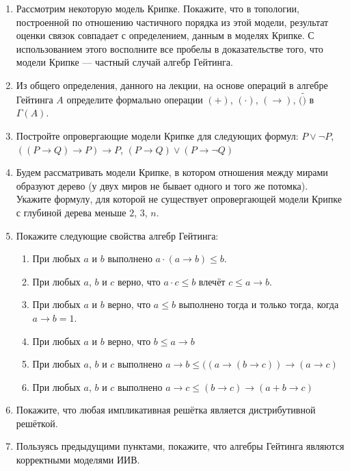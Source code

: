 \documentclass[10pt,a4paper,oneside]{article}
\begin{document}
\begin{enumerate}
\item Рассмотрим некоторую модель Крипке. Покажите, что в топологии, построенной по 
отношению частичного порядка из этой модели, результат оценки связок совпадает с определением, 
данным в моделях Крипке. С использованием этого восполните все пробелы в доказательстве 
того, что модели Крипке --- частный случай алгебр Гейтинга.
\item Из общего определения, данного на лекции, на основе операций в алгебре Гейтинга $A$ 
определите формально операции $(+)$, $(\cdot)$, $(\rightarrow)$, $(\tilde)$ в $\Gamma(A)$.
\item Постройте опровергающие модели Крипке для следующих формул:
$P\vee\neg P$, $((P\rightarrow Q)\rightarrow P)\rightarrow P$, 
$(P\rightarrow Q)\vee(P\rightarrow\neg Q)$
\item Будем рассматривать модели Крипке, в котором отношения между мирами образуют дерево
(у двух миров не бывает одного и того же потомка). Укажите формулу, для которой не 
существует опровергающей модели Крипке с глубиной дерева меньше $2$, $3$, $n$.
\item Покажите следующие свойства алгебр Гейтинга:
\begin{enumerate}
\item При любых $a$ и $b$ выполнено $a\cdot (a\rightarrow b) \le b$.
\item При любых $a$, $b$ и $c$ верно, что $a\cdot c \le b$ влечёт $c \le a \rightarrow b$.
\item При любых $a$ и $b$ верно, что $a \le b$ выполнено тогда и только тогда, когда $a \rightarrow b = 1$.
\item При любых $a$ и $b$ верно, что $b \le a \rightarrow b$
\item При любых $a$, $b$ и $c$ выполнено $a\rightarrow b \le ((a\rightarrow (b \rightarrow c)) \rightarrow (a\rightarrow c)$
\item При любых $a$, $b$ и $c$ выполнено $a\rightarrow c \le (b\rightarrow c) \rightarrow (a+b \rightarrow c)$
\end{enumerate}
\item Покажите, что любая импликативная решётка является дистрибутивной решёткой.
\item Пользуясь предыдущими пунктами, покажите, что алгебры Гейтинга являются 
корректными моделями ИИВ.
\end{enumerate}
\end{document}
